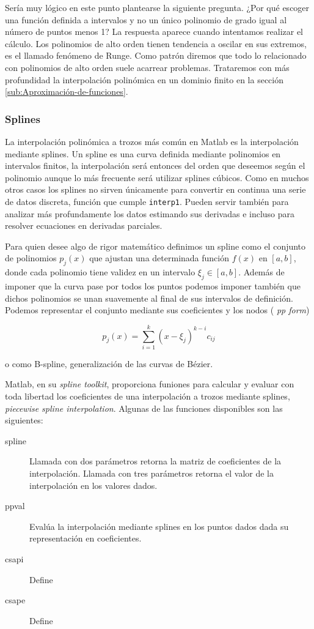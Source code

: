 Sería muy lógico en este punto plantearse la siguiente pregunta. ¿Por
qué escoger una función definida a intervalos y no un único polinomio
de grado igual al número de puntos menos 1? La respuesta aparece
cuando intentamos realizar el cálculo. Los polinomios de alto orden
tienen tendencia a oscilar en sus extremos, es el llamado fenómeno de
Runge.  Como patrón diremos que todo lo relacionado con polinomios de
alto orden suele acarrear problemas. Trataremos con más profundidad la
interpolación polinómica en un dominio finito en la sección
\ref{sub:Aproximación-de-funciones}.

\subsubsection{Splines}
\label{sec:splines}
La interpolación polinómica a trozos más común en Matlab es la
interpolación mediante splines.  Un spline es una curva definida
mediante polinomios en intervalos finitos, la interpolación será
entonces del orden que deseemos según el polinomio aunque lo más
frecuente será utilizar splines cúbicos.  Como en muchos otros casos
los splines no sirven únicamente para convertir en continua una serie
de datos discreta, función que cumple \texttt{interp1}.  Pueden servir
también para analizar más profundamente los datos estimando sus
derivadas e incluso para resolver ecuaciones en derivadas parciales.

Para quien desee algo de rigor matemático definimos un spline como el
conjunto de polinomios $p_j(x)$ que ajustan una determinada función
$f(x)$ en $[a,b]$, donde cada polinomio tiene validez en un intervalo
$\xi_j \in [a,b]$.  Además de imponer que la curva pase por todos los
puntos podemos imponer también que dichos polinomios se unan
suavemente al final de sus intervalos de definición.  Podemos
representar el conjunto mediante sus coeficientes y los nodos (
\emph{pp form})

$$p_j(x)=\sum_{i=1}^k(x-\xi_j)^{k-i}c_{ij}$$

o como B-spline, generalización de las curvas de Bézier.

Matlab, en su \emph{spline toolkit}, proporciona funiones para
calcular y evaluar con toda libertad los coeficientes de una
interpolación a trozos mediante splines, \emph{piecewise spline
  interpolation}.  Algunas de las funciones disponibles son las
siguientes:

\begin{description}
\item[spline] Llamada con dos parámetros retorna la
  matriz de coeficientes de la interpolación.  Llamada con tres
  parámetros retorna el valor de la interpolación en los valores
  dados.
\item[ppval] Evalúa la interpolación mediante splines en
  los puntos dados dada su representación en coeficientes.
\item[csapi] Define
\item[csape] Define
\end{description}

